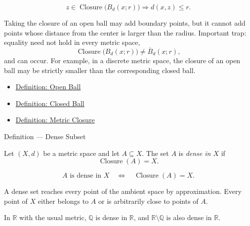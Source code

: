\begin{remark*}
\[
z\in \operatorname{Closure}\bigl(B_d(x;r)\bigr)
\Longrightarrow
d(x,z)\leq r.
\]
\end{remark*}

\begin{remark*}[Interpretation]
Taking the closure of an open ball may add boundary points, but it cannot add
points whose distance from the center is larger than the radius.  Important
trap: equality need not hold in every metric space,
\[
  \operatorname{Closure}\bigl(B_d(x;r)\bigr)\neq \overline{B}_d(x;r),
\]
and can occur.  For example, in a discrete metric space, the closure of an
open ball may be strictly smaller than the corresponding closed ball.
\end{remark*}

\begin{dependencies}
\begin{itemize}
  \item \hyperref[def:metric-open-ball]{Definition: Open Ball}
  \item \hyperref[def:metric-closed-ball]{Definition: Closed Ball}
  \item \hyperref[def:metric-closure]{Definition: Metric Closure}
\end{itemize}
\end{dependencies}

\begin{definitionbox}{Definition --- Dense Subset}
\begin{definition}\label{def:metric-dense-subset}
Let \((X,d)\) be a metric space and let \(A\subseteq X\).  The set \(A\) is
\emph{dense in \(X\)} if
\[
  \operatorname{Closure}(A)=X.
\]
\end{definition}
\end{definitionbox}

\begin{remark*}
\[
A\text{ is dense in }X
\quad\Longleftrightarrow\quad
\operatorname{Closure}(A)=X.
\]
\end{remark*}

\begin{remark*}[Interpretation]
A dense set reaches every point of the ambient space by approximation.  Every
point of \(X\) either belongs to \(A\) or is arbitrarily close to points of
\(A\).
\end{remark*}

\begin{remark*}[Examples]
In \(\mathbb{R}\) with the usual metric, \(\mathbb{Q}\) is dense in
\(\mathbb{R}\), and \(\mathbb{R}\setminus\mathbb{Q}\) is also dense in
\(\mathbb{R}\).
\end{remark*}

